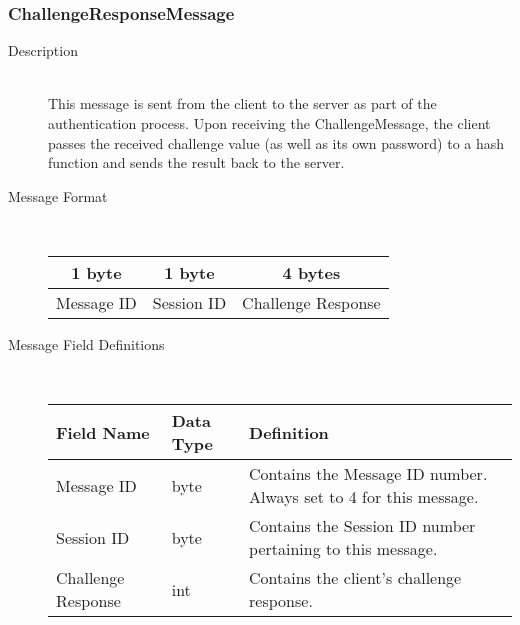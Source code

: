 \documentclass[12pt,letterpaper,titlepage]{article}
\begin{document}
\subsubsection{ChallengeResponseMessage}
	\begin{description}
	\item[Description] \hfill \\
		This message is sent from the client to the server as part of the authentication process.  
		Upon receiving the ChallengeMessage, the client passes the received challenge value 
		(as well as its own password) to a hash function and sends the result back to the server.
	\item[Message Format] \hfill \\
	\begin{tabular}{ | c | c | c | }
		\hline
		1 byte & 1 byte & 4 bytes \\
		\hline
		Message ID & Session ID &  Challenge Response \\
		\hline
	\end{tabular}
	\item[Message Field Definitions] \hfill \\
	\begin{tabular}{ | p{3cm} | p{1.5cm} | p{8cm} | }
		\hline
		Field Name & Data Type & Definition \\
		\hline
		Message ID & byte & Contains the Message ID number. 
					\newline Always set to 4 for this message. \\
		\hline
		Session ID & byte & Contains the Session ID number pertaining to this message. \\
		\hline
		Challenge Response & int & Contains the client's challenge response. \\
		\hline
	\end{tabular}
	\end{description}
\end{document}
